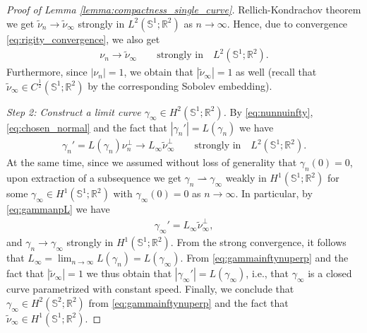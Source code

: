 \documentclass[11pt]{article}
\numberwithin{statement}{section}
\numberwithin{equation}{section}
\theoremstyle{remark}
\newcommand{\R}{\mathbb R} 				%
\newcommand{\Sph}{{\mathbb S}}				%
\begin{document}
\begin{proof}[Proof of Lemma \ref{lemma:compactness_single_curve}]
        Rellich-Kondrachov theorem we get
        $\tilde \nu_{n} \to \tilde \nu_\infty$ strongly in
        $L^2(\Sph^1; \R^2)$ as $n \to \infty$.  Hence, due to
        convergence \eqref{eq:rigity_convergence}, we also get
        \begin{align} \label{eq:nunnuinfty}
          \nu_{n} \to \tilde \nu_\infty \qquad \text{strongly in} \quad
          L^2(\Sph^1; \R^2). 
        \end{align}
        Furthermore, since
        $|\nu_n| = 1$, we obtain that $|\tilde \nu_\infty| =1$ as well
        (recall that
        $\tilde \nu_\infty \in C^\frac{1}{2}(\Sph^1; \R^2)$ by the
        corresponding Sobolev embedding).

        \textit{Step 2: Construct a limit curve
          $\gamma_\infty \in H^2(\Sph^1; \R^2)$.}  By
        \eqref{eq:nunnuinfty}, \eqref{eq:chosen_normal} and the fact
        that $|\gamma_n'| = L(\gamma_n)$ we have
          \begin{align} \label{eq:gammanpL} \gamma_{n}' =
            L(\gamma_n) \nu_{n}^\perp \to L_\infty \tilde
            \nu_\infty^\perp \qquad \text{strongly in} \quad
          L^2(\Sph^1; \R^2).
        \end{align}
        At the same time, since we assumed without loss of generality
        that $\gamma_n(0) = 0$, upon extraction of a subsequence we
        get $\gamma_{n} \rightharpoonup \gamma_\infty$ weakly in
        $H^1(\Sph^1; \R^2)$ for some
        $\gamma_\infty \in H^1(\Sph^1; \R^2)$ with
          $\gamma_\infty(0) = 0$ as $n \to \infty$. In particular, by
        \eqref{eq:gammanpL} we have
        \begin{align} \label{eq:gammainftynuperp}
          \gamma_\infty' = L_\infty \tilde \nu_\infty^\perp,
        \end{align}
        and $\gamma_n \to \gamma_\infty$ strongly in
        $H^1(\Sph^1; \R^2)$.  From the strong convergence, it follows
        that
        $L_\infty = \lim_{n \to \infty} L(\gamma_{n}) =
        L(\gamma_\infty)$. From \eqref{eq:gammainftynuperp} and the
        fact that $|\tilde \nu_\infty| = 1$ we thus obtain that
        $|\gamma_\infty'| = L(\gamma_\infty)$, i.e., that
        $\gamma_\infty$ is a closed curve parametrized with constant
        speed. Finally, we conclude that
        $\gamma_\infty \in H^2(\Sph^2;\R^2)$ from
        \eqref{eq:gammainftynuperp} and the fact that
        $\tilde \nu_\infty \in H^1(\Sph^1; \R^2)$.
	

\end{proof}
\end{document}

